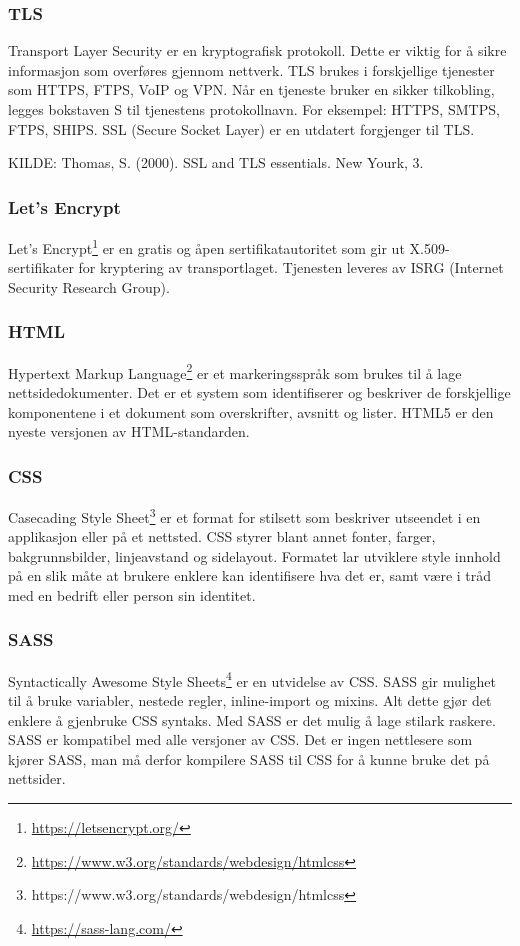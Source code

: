 \subsubsection{TLS}
Transport Layer Security er en kryptografisk protokoll. Dette er viktig for å sikre informasjon som overføres gjennom nettverk. TLS brukes i forskjellige tjenester som HTTPS, FTPS, VoIP og VPN.
Når en tjeneste bruker en sikker tilkobling, legges bokstaven S til tjenestens protokollnavn. For eksempel: HTTPS, SMTPS, FTPS, SHIPS.
SSL (Secure Socket Layer) er en utdatert forgjenger til TLS.

KILDE: Thomas, S. (2000). SSL and TLS essentials. New Yourk, 3.

\subsubsection{Let’s Encrypt}
Let’s Encrypt\footnote{\url{https://letsencrypt.org/}} er en gratis og åpen sertifikatautoritet som gir ut X.509-sertifikater for kryptering av transportlaget. Tjenesten leveres av ISRG (Internet Security Research Group).

\subsubsection{HTML}
Hypertext Markup Language\footnote{\url{https://www.w3.org/standards/webdesign/htmlcss}} er et markeringsspråk som brukes til å lage nettsidedokumenter. Det er et system som identifiserer og beskriver de forskjellige komponentene i et dokument som overskrifter, avsnitt og lister. HTML5 er den nyeste versjonen av HTML-standarden.

\subsubsection{CSS}
Casecading Style Sheet\footnote{https://www.w3.org/standards/webdesign/htmlcss} er et format for stilsett som beskriver utseendet i en applikasjon eller på et nettsted. CSS styrer blant annet fonter, farger, bakgrunnsbilder, linjeavstand og sidelayout. Formatet lar utviklere style innhold på en slik måte at brukere enklere kan identifisere hva det er, samt være i tråd med en bedrift eller person sin identitet.

\subsubsection{SASS}
Syntactically Awesome Style Sheets\footnote{\url{https://sass-lang.com/}} er en utvidelse av CSS. SASS gir mulighet til å bruke variabler, nestede regler, inline-import og mixins. Alt dette gjør det enklere å gjenbruke CSS syntaks. Med SASS er det mulig å lage stilark raskere. SASS er kompatibel med alle versjoner av CSS. Det er ingen nettlesere som kjører SASS, man må derfor kompilere SASS til CSS for å kunne bruke det på nettsider.

